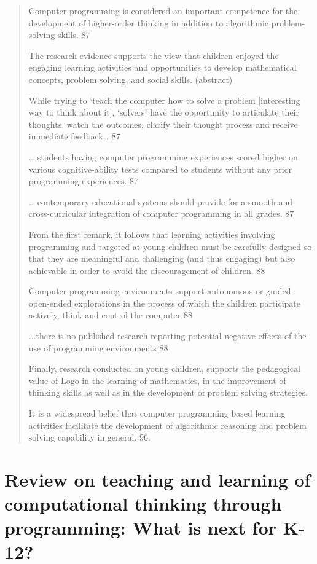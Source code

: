 \documentclass[12pt]{extarticle}
\begin{document}
{\begin{quotation}
    
    Computer programming is considered an important competence for the development of higher-order thinking in addition to algorithmic problem-solving skills. 87
    
    The research evidence supports the view that children enjoyed the engaging learning activities and opportunities to develop mathematical concepts, problem solving, and social skills. 	(abstract)
    
    While trying to ‘teach the computer how to solve a problem [interesting way to think about it], ‘solvers’ have the opportunity to articulate their thoughts, watch the outcomes, clarify their thought process and receive immediate feedback… 87
    
    … students having computer programming experiences scored higher on various cognitive-ability tests compared to students without any prior programming experiences. 	87
    
    … contemporary educational systems should provide for a smooth and cross-curricular integration of computer programming in all grades.	87
    
    From the first remark, it follows that learning activities involving programming and targeted at young children must be carefully designed so that they are meaningful and challenging (and thus engaging) but also achievable in order to avoid the discouragement of children. 88
    
    Computer programming environments support autonomous or guided open-ended explorations in the process of which the children participate actively, think and control the computer	88
    
    ...there is no published research reporting potential negative effects of the use of programming environments	88
    
    Finally, research conducted on young children, supports the pedagogical value of Logo in the learning of mathematics, in the improvement of thinking skills as well as in the development of problem solving strategies.
    
    It is a widespread belief that computer programming based learning activities facilitate the development of algorithmic reasoning and problem solving capability in general. 	96.

\end{quotation}    

\section*{Review on teaching and learning of computational thinking through programming: What is next for K-12?} 
}
\end{document}
